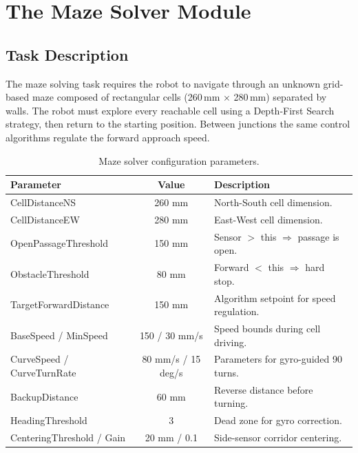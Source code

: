 \section{The Maze Solver Module}
\label{sec:maze-solver}

\subsection{Task Description}
\label{sec:ms-task}

The maze solving task requires the robot to navigate through an unknown grid-based maze composed of rectangular cells (260\,mm $\times$ 280\,mm) separated by walls. The robot must explore every reachable cell using a Depth-First Search strategy, then return to the starting position. Between junctions the same control algorithms regulate the forward approach speed.

\begin{table}[htbp]
\centering
\caption{Maze solver configuration parameters.}
\label{tab:ms-config}
\begin{tabular}{l c p{6.5cm}}
\hline
\textbf{Parameter} & \textbf{Value} & \textbf{Description} \\
\hline
CellDistanceNS        & 260 mm   & North-South cell dimension. \\
CellDistanceEW        & 280 mm   & East-West cell dimension. \\
OpenPassageThreshold   & 150 mm   & Sensor $>$ this $\Rightarrow$ passage is open. \\
ObstacleThreshold      & 80 mm    & Forward $<$ this $\Rightarrow$ hard stop. \\
TargetForwardDistance  & 150 mm   & Algorithm setpoint for speed regulation. \\
BaseSpeed / MinSpeed   & 150 / 30 mm/s & Speed bounds during cell driving. \\
CurveSpeed / CurveTurnRate & 80 mm/s / 15 deg/s & Parameters for gyro-guided 90\textdegree{} turns. \\
BackupDistance         & 60 mm    & Reverse distance before turning. \\
HeadingThreshold       & 3\textdegree{}    & Dead zone for gyro correction. \\
CenteringThreshold / Gain & 20 mm / 0.1 & Side-sensor corridor centering. \\
\hline
\end{tabular}
\end{table}


